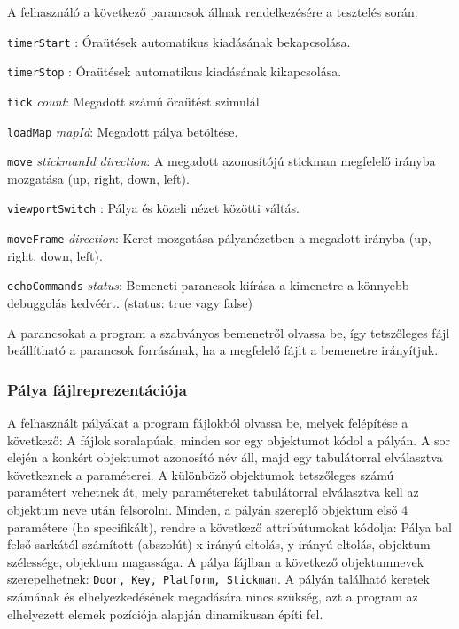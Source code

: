 	    A felhasználó a következő parancsok állnak rendelkezésére a tesztelés során:
	    
	    \newcommand{\cmd}[1]{\item{\texttt{#1}} }
	    \begin{description}
	        \cmd{timerStart}: Óraütések automatikus kiadásának bekapcsolása.
	        \cmd{timerStop}: Óraütések automatikus kiadásának kikapcsolása.
	        \cmd{tick} \emph{count}: Megadott számú öraütést szimulál.
	        \cmd{loadMap} \emph{mapId}: Megadott pálya betöltése.
	        \cmd{move} \emph{stickmanId} \emph{direction}: A megadott azonosítójú stickman megfelelő irányba mozgatása (up, right, down, left).
	        \cmd{viewportSwitch}: Pálya és közeli nézet közötti váltás.
	        \cmd{moveFrame} \emph{direction}: Keret mozgatása pályanézetben a megadott irányba (up, right, down, left).
	        \cmd{echoCommands} \emph{status}: Bemeneti parancsok kiírása a kimenetre a könnyebb debuggolás kedvéért. (status: true vagy false)
        \end{description}
        
        A parancsokat a program a szabványos bemenetről olvassa be, így tetszőleges fájl beállítható a parancsok forrásának, ha a megfelelő fájlt a bemenetre irányítjuk.
        
        \subsubsection{Pálya fájlreprezentációja}
        A felhasznált pályákat a program fájlokból olvassa be, melyek felépítése a következő: A fájlok soralapúak, minden sor egy objektumot kódol a pályán. A sor elején a konkért objektumot azonosító név áll, majd egy tabulátorral elválasztva következnek a paraméterei. A különböző objektumok tetszőleges számú paramétert vehetnek át, mely paramétereket tabulátorral elválasztva kell az objektum neve után felsorolni. Minden, a pályán szereplő objektum első 4 paramétere (ha specifikált), rendre a következő attribútumokat kódolja: Pálya bal felső sarkától számított (abszolút) x irányú eltolás, y irányú eltolás, objektum szélessége, objektum magassága. A pálya fájlban a következő objektumnevek szerepelhetnek: \texttt{Door, Key, Platform, Stickman}. A pályán található keretek számának és elhelyezkedésének megadására nincs szükség, azt a program az elhelyezett elemek pozíciója alapján dinamikusan építi fel.
        
